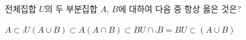 전체집합 $U$의 두 부분집합 $A$, $B$에 대하여 다음 중 항상 옳은 것은?
\begin{choices32}{$A\subset\comp{U}$}{$(A\cup B)\subset A$}{$(A\cap B)\subset B$}{$U\cap\comp{B}=B$}{$U\subset(A\cup B)$}\end{choices32}
